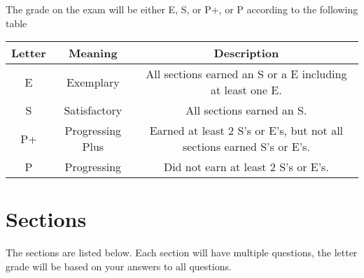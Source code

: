 \documentclass[12pt]{amsart}
\theoremstyle{definition}
\begin{document}
The grade on the exam will be either E, S, or P+, or P according to the following table 

\begin{center}
\begin{tabular}{|c|c|c|}
\hline
Letter &Meaning &Description\\
\hline
E &Exemplary &All sections earned an S or a E including at least one E. \\
\hline
S &Satisfactory &All sections earned an S.\\
\hline
P+ &Progressing Plus &Earned at least 2 S's or E's, but not all sections earned S's or E's.\\
\hline
P &Progressing &Did not earn at least 2 S's or E's.\\
\hline
\end{tabular}
\end{center}

\newpage

\section{Sections}

The sections are listed below. Each section will have multiple questions, the letter grade will be based on your answers to all questions.
\vfill
\end{document}
